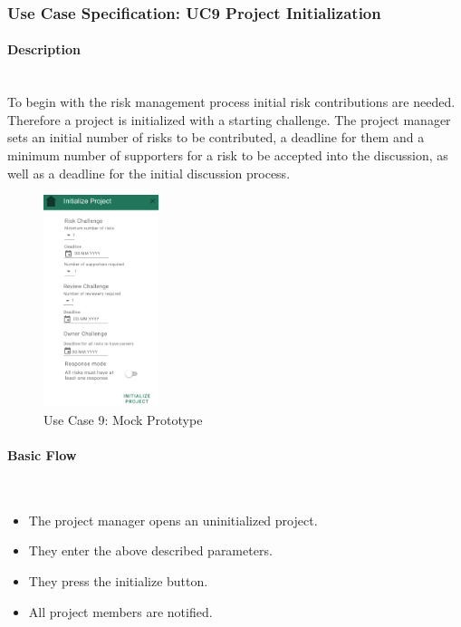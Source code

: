 
\newpage
\subsubsection{Use Case Specification: \ac{UC}9 Project Initialization}
\label{sec:domainBbj}

\paragraph*{Description}\mbox{}\\
To begin with the risk management process initial risk contributions are needed. Therefore a project is initialized with a starting challenge. The project manager sets an initial number of risks to be contributed, a deadline for them and a minimum number of supporters for a risk to be accepted into the discussion, as well as a deadline for the initial discussion process.

\begin{figure}
	\includegraphics[width=0.3\textwidth]{Assets/UC_Screenshots/UC9S.png}
	\caption{Use Case 9: Mock Prototype}
	\label{fig:useCase9Detail}
\end{figure}

\paragraph*{Basic Flow} \mbox{}\\

\begin{itemize}
	\vspace{-3mm}
	\setlength\itemsep{-1em}
	\item The project manager opens an uninitialized project.
	\item They enter the above described parameters.
	\item They press the initialize button.
	\item All project members are notified.
\end{itemize} 

